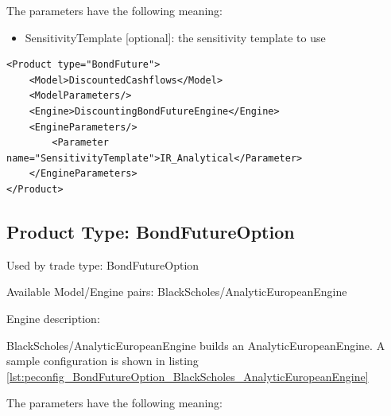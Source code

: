The parameters have the following meaning:

\begin{itemize}
\item SensitivityTemplate [optional]: the sensitivity template to use
\end{itemize}

\begin{longlisting}
\begin{verbatim}
<Product type="BondFuture">
    <Model>DiscountedCashflows</Model>
    <ModelParameters/>
    <Engine>DiscountingBondFutureEngine</Engine>
    <EngineParameters/>
        <Parameter name="SensitivityTemplate">IR_Analytical</Parameter>
    </EngineParameters>
</Product>
\end{verbatim}
\caption{Configuration for Product BondFuture, Model DiscountedCashflows, Engine BondFutureEngine}
\label{lst:peconfig_BondFuture_DiscountedCashflows_DiscountingBondFutureEngine}
\end{longlisting}

\subsection{Product Type: BondFutureOption}

Used by trade type: BondFutureOption

Available Model/Engine pairs: BlackScholes/AnalyticEuropeanEngine

Engine description:

BlackScholes/AnalyticEuropeanEngine builds an AnalyticEuropeanEngine. A sample configuration is shown in listing
\ref{lst:peconfig_BondFutureOption_BlackScholes_AnalyticEuropeanEngine}

The parameters have the following meaning:

